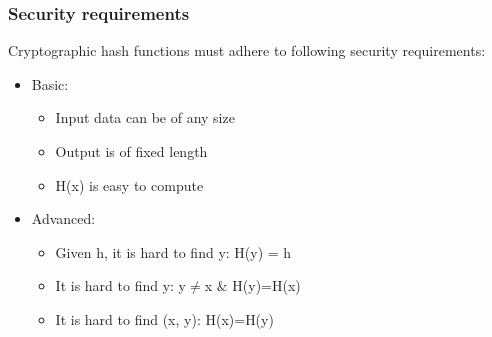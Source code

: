 \documentclass[12pt]{article}
\begin{document}
\subsubsection{Security requirements}
Cryptographic hash functions must adhere to following security requirements:
\begin{itemize}
	\item Basic:
	\begin{itemize}
		\item Input data can be of any size
		\item Output is of fixed length
		\item H(x) is easy to compute
	\end{itemize}
	\item Advanced:
	\begin{itemize}
		\item Given h, it is hard to find y: H(y) = h
		\item It is hard to find y: y$\ne$x $\&$ H(y)=H(x)
		\item It is hard to find (x, y): H(x)=H(y)
	\end{itemize}
\end{itemize}
\end{document}
